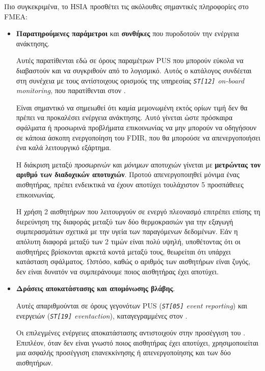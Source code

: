 \documentclass[a4paper,nobib]{tufte-book}
\begin{document}
Πιο συγκεκριμένα, το \ac{HSIA} προσθέτει τις ακόλουθες σημαντικές πληροφορίες στο \ac{FMEA}:\autocite{ECSS-Q-ST-30-02C}
\begin{itemize}
	\item \textbf{Παρατηρούμενες παράμετροι} και \textbf{συνθήκες} που πυροδοτούν την ενέργεια ανάκτησης.
	
	Αυτές παρατίθενται εδώ σε όρους παραμέτρων \ac{PUS} που μπορούν εύκολα να διαβαστούν και να συγκριθούν από το λογισμικό. Αυτός ο κατάλογος συνδέεται στη συνέχεια με τους αντίστοιχους ορισμούς της υπηρεσίας \emph{\texttt{ST[12]} on-board monitoring}, που παρατίθενται στον .
	
	Είναι σημαντικό να σημειωθεί ότι καμία μεμονωμένη εκτός ορίων τιμή δεν θα πρέπει να προκαλέσει ενέργεια ανάκτησης. Αυτό γίνεται ώστε πρόσκαιρα σφάλματα ή προσωρινά προβλήματα επικοινωνίας να μην μπορούν να οδηγήσουν σε κάποια άσκοπη ενεργοποίηση του \ac{FDIR}, που θα μπορούσε να απενεργοποιήσει ένα καλά λειτουργικό εξάρτημα.
	
	Η διάκριση μεταξύ \emph{προσωρινών} και \emph{μόνιμων} αποτυχιών γίνεται με \textbf{μετρώντας τον αριθμό των διαδοχικών αποτυχιών}. Προτού απενεργοποιηθεί μόνιμα ένας αισθητήρας, πρέπει ενδεικτικά να έχουν αποτύχει τουλάχιστον 5 προσπάθειες επικοινωνίας.
	
	Η χρήση 2 αισθητήρων που λειτουργούν σε ενεργό πλεονασμό επιτρέπει επίσης τη διερεύνηση της διαφοράς μεταξύ των δύο θερμοκρασιών για την εξαγωγή συμπερασμάτων σχετικά με την υγεία των παραγόμενων δεδομένων. Εάν η απόλυτη διαφορά μεταξύ των 2 τιμών είναι πολύ υψηλή, υποθέτοντας ότι οι αισθητήρες βρίσκονται αρκετά κοντά μεταξύ τους, θεωρείται ότι υπάρχει κατάσταση σφάλματος. Ωστόσο, καθώς ο αριθμός των αισθητήρων είναι ζυγός, δεν είναι δυνατόν να συμπεράνουμε ποιος αισθητήρας έχει αποτύχει.
	
	\item \textbf{Δράσεις αποκατάστασης και απομόνωσης βλάβης}.
	
	Αυτές απαριθμούνται σε όρους γεγονότων \ac{PUS} (\emph{\texttt{ST[05]} event reporting}) και ενεργειών (\emph{\texttt{ST[19]} eventaction}), καταγεγραμμένες στον .
	
	Οι επιλεγμένες ενέργειες αποκατάστασης αντιστοιχούν στην προσέγγιση του . Επιπλέον, όταν δεν είναι γνωστό ποιος αισθητήρας έχει αποτύχει, χρησιμοποιείται μια ασφαλής προσέγγιση επανεκκίνησης ή απενεργοποίησης και των δύο αισθητήρων.
\end{itemize}
\end{document}
